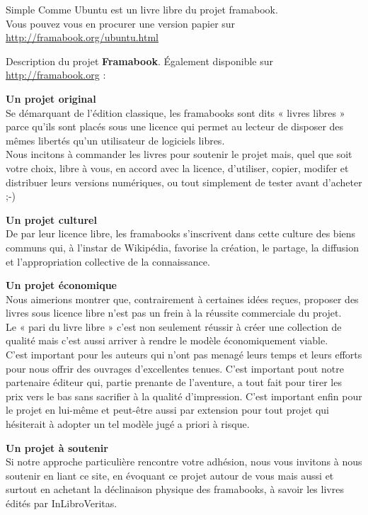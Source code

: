 \thispagestyle{empty}
\null{}
{\centering\fontsize{14}{16}\selectfont{}Simple Comme Ubuntu est un livre libre du projet framabook.\\
Vous pouvez vous en procurer une version papier sur\\\url{http://framabook.org/ubuntu.html}}\par
{\fontsize{12}{14}\selectfont{}Description du projet \textbf{Framabook}. Également disponible sur \url{http://framabook.org} :\par
\textbf{Un projet original}\\
Se démarquant de l'édition classique, les framabooks sont dits « livres libres » parce qu'ils sont placés sous une licence qui permet au lecteur de disposer des mêmes libertés qu'un utilisateur de logiciels libres.\\
Nous incitons à commander les livres pour soutenir le projet mais, quel que soit votre choix, libre à vous, en accord avec la licence, d'utiliser, copier, modifer et distribuer leurs versions numériques, ou tout simplement de tester avant d'acheter ;-)\par
\textbf{Un projet culturel}\\
De par leur licence libre, les framabooks s'inscrivent dans cette culture des biens communs qui, à l'instar de Wikipédia, favorise la création, le partage, la diffusion et l'appropriation collective de la connaissance.\par
\textbf{Un projet économique}\\
Nous aimerions montrer que, contrairement à certaines idées reçues, proposer des livres sous licence libre n'est pas un frein à la réussite commerciale du projet.\\
Le « pari du livre libre » c'est non seulement réussir à créer une collection de qualité mais c'est aussi arriver à rendre le modèle économiquement viable.\\
C'est important pour les auteurs qui n'ont pas menagé leurs temps et leurs efforts pour nous offrir des ouvrages d'excellentes tenues. C'est important pout notre partenaire éditeur qui, partie prenante de l'aventure, a tout fait pour tirer les prix vers le bas sans sacrifier à la qualité d'impression. C'est important enfin pour le projet en lui-même et peut-être aussi par extension pour tout projet qui hésiterait à adopter un tel modèle jugé a priori à risque.\par
\textbf{Un projet à soutenir}\\
Si notre approche particulière rencontre votre adhésion, nous vous invitons à nous soutenir en liant ce site, en évoquant ce projet autour de vous mais aussi et surtout en achetant la déclinaison physique des framabooks, à savoir les livres édités par InLibroVeritas.\\
}
